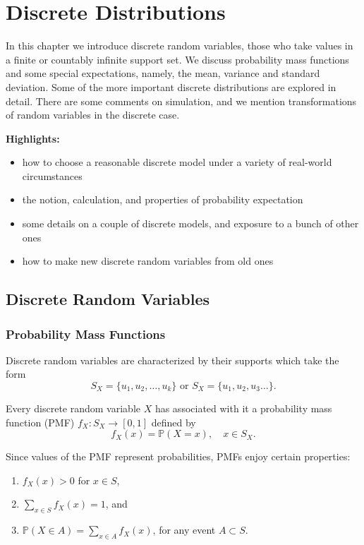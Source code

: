 \chapter{Discrete Distributions}
\label{sec-5}

\noindent
In this chapter we introduce discrete random variables, those who take
values in a finite or countably infinite support set. We discuss
probability mass functions and some special expectations, namely, the
mean, variance and standard deviation. Some of the more important
discrete distributions are explored in detail.
There are some comments on simulation, and we mention transformations
of random variables in the discrete case.

\textbf{Highlights:}
\begin{itemize}
\item how to choose a reasonable discrete model under a variety of
real-world circumstances
\item the notion, calculation, and properties of probability expectation
\item some details on a couple of discrete models, and exposure to a bunch
of other ones
\item how to make new discrete random variables from old ones
\end{itemize}

\section{Discrete Random Variables}
\label{sec-5-1}

\subsection{Probability Mass Functions}
\label{sec-5-1-1}

Discrete random variables are characterized by their supports which
take the form
\begin{equation}
S_{X}=\{u_{1},u_{2},\ldots,u_{k}\}\mbox{ or }S_{X}=\{u_{1},u_{2},u_{3}\ldots\}.
\end{equation}

Every discrete random variable \(X\) has associated with it a
probability mass function (PMF) \(f_{X}:S_{X}\to[0,1]\) defined by
\begin{equation}
f_{X}(x)=\mathbb{P}(X=x),\quad x\in S_{X}.
\end{equation}

Since values of the PMF represent probabilities, PMFs enjoy certain properties:
\begin{enumerate}
\item \(f_{X}(x)>0\) for \(x\in S\),
\item \(\sum_{x\in S}f_{X}(x)=1\), and
\item \(\mathbb{P}(X\in A)=\sum_{x\in A}f_{X}(x)\), for any event
\(A\subset S\).
\end{enumerate}

